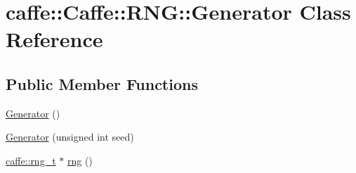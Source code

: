 \hypertarget{classcaffe_1_1_caffe_1_1_r_n_g_1_1_generator}{\section{caffe\+:\+:Caffe\+:\+:R\+N\+G\+:\+:Generator Class Reference}
\label{classcaffe_1_1_caffe_1_1_r_n_g_1_1_generator}
}
\subsection*{Public Member Functions}
\begin{DoxyCompactItemize}
\item 
\hyperlink{classcaffe_1_1_caffe_1_1_r_n_g_1_1_generator_a547a6adff11d675498a1fa3a55875d75}{Generator} ()
\item 
\hyperlink{classcaffe_1_1_caffe_1_1_r_n_g_1_1_generator_a25f41946ec93504bb7b132ef5072c0fc}{Generator} (unsigned int seed)
\item 
\hyperlink{namespacecaffe_aeff0d41eefd30caf64b0c9d03e142af3}{caffe\+::rng\+\_\+t} $\ast$ \hyperlink{classcaffe_1_1_caffe_1_1_r_n_g_1_1_generator_a43c97cbef420858b7f611396cc5093bf}{rng} ()
\end{DoxyCompactItemize}


